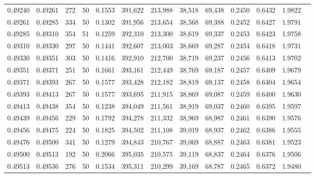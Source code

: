\begin{tabular}{rrrrrrrrrrrrr}
0.49240 & 0.49261 &   272 &  50 &                                     0.1553 & 391,622 & 213,988 &  38,518 &  69,438 & 0.2450 & 0.6432 & 1.9822 \\
0.49261 & 0.49285 &   334 &  50 &                                     0.1302 & 391,956 & 213,654 &  38,568 &  69,388 & 0.2452 & 0.6427 & 1.9791 \\
0.49285 & 0.49310 &   354 &  51 &                                     0.1259 & 392,310 & 213,300 &  38,619 &  69,337 & 0.2453 & 0.6423 & 1.9758 \\
0.49310 & 0.49330 &   297 &  50 &                                     0.1441 & 392,607 & 213,003 &  38,669 &  69,287 & 0.2454 & 0.6418 & 1.9731 \\
0.49330 & 0.49351 &   303 &  50 &                                     0.1416 & 392,910 & 212,700 &  38,719 &  69,237 & 0.2456 & 0.6413 & 1.9702 \\
0.49351 & 0.49371 &   251 &  50 &                                     0.1661 & 393,161 & 212,449 &  38,769 &  69,187 & 0.2457 & 0.6409 & 1.9679 \\
0.49371 & 0.49393 &   267 &  50 &                                     0.1577 & 393,428 & 212,182 &  38,819 &  69,137 & 0.2458 & 0.6404 & 1.9654 \\
0.49393 & 0.49413 &   267 &  50 &                                     0.1577 & 393,695 & 211,915 &  38,869 &  69,087 & 0.2459 & 0.6400 & 1.9630 \\
0.49413 & 0.49438 &   354 &  50 &                                     0.1238 & 394,049 & 211,561 &  38,919 &  69,037 & 0.2460 & 0.6395 & 1.9597 \\
0.49439 & 0.49456 &   229 &  50 &                                     0.1792 & 394,278 & 211,332 &  38,969 &  68,987 & 0.2461 & 0.6390 & 1.9576 \\
0.49456 & 0.49475 &   224 &  50 &                                     0.1825 & 394,502 & 211,108 &  39,019 &  68,937 & 0.2462 & 0.6386 & 1.9555 \\
0.49476 & 0.49500 &   341 &  50 &                                     0.1279 & 394,843 & 210,767 &  39,069 &  68,887 & 0.2463 & 0.6381 & 1.9523 \\
0.49500 & 0.49513 &   192 &  50 &                                     0.2066 & 395,035 & 210,575 &  39,119 &  68,837 & 0.2464 & 0.6376 & 1.9506 \\
0.49513 & 0.49536 &   276 &  50 &                                     0.1534 & 395,311 & 210,299 &  39,169 &  68,787 & 0.2465 & 0.6372 & 1.9480 \\

\end{tabular}
